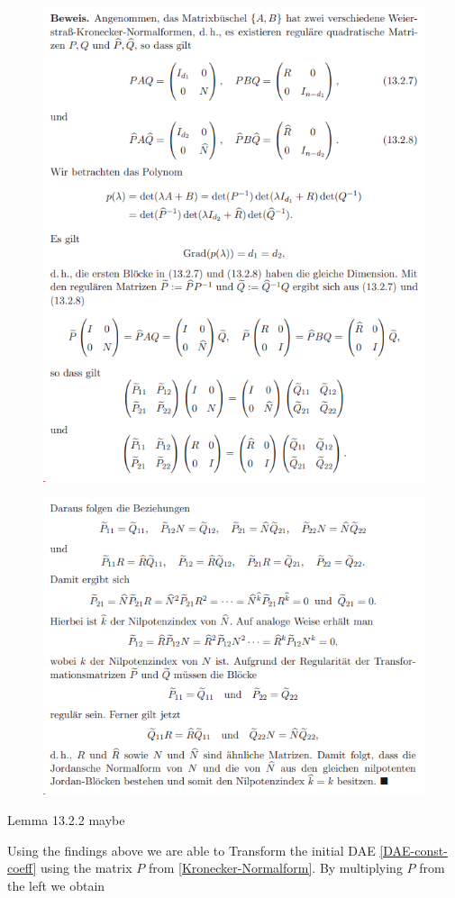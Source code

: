 \documentclass[11pt,titlepage]{article}
\begin{document}
				\begin{figure}
					\centering
					\includegraphics[width=0.7\linewidth]{screenshot003}
					\caption{}
					\label{fig:screenshot003}
				\end{figure}
				
				\begin{figure}
					\centering
					\includegraphics[width=0.7\linewidth]{screenshot004}
					\caption{}
					\label{fig:screenshot004}
				\end{figure}
				
				
				Lemma 13.2.2 maybe
				
				Using the findings above we are able to Transform the initial DAE \ref{DAE-const-coeff} using the matrix $P$ from \ref{Kronecker-Normalform}. By multiplying $P$ from the left we obtain
				
\end{document}
